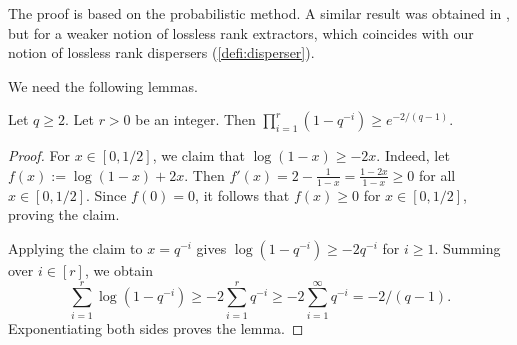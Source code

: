\documentclass[11pt]{article}
\begin{document}
The proof is based on the probabilistic method. A similar result was obtained in \cite[Section~5.3]{For14}, but for a weaker notion of lossless rank extractors, which coincides with our notion of lossless rank dispersers (\cref{defi:disperser}).

We need the following lemmas.

\begin{lemma}\label{lem:ineq}
Let $q\geq 2$. Let $r>0$ be an integer. Then $\prod_{i=1}^r (1-q^{-i})\geq e^{-2/(q-1)}$.
\end{lemma}

\begin{proof}
For \(x\in[0,1/2]\), we claim that $\log(1-x)\ge -2x$.
Indeed, let $f(x):=\log(1-x)+2x$. Then
$f'(x)=2-\frac{1}{1-x}=\frac{1-2x}{1-x}\ge 0$
for all \(x\in[0,1/2]\). Since \(f(0)=0\), it follows that \(f(x)\ge 0\) for \(x\in[0,1/2]\), proving the claim.

Applying the claim to $x=q^{-i}$ gives $\log(1-q^{-i})\ge -2q^{-i}$ for $i\geq 1$.
Summing over \(i\in [r]\), we obtain
\[
\sum_{i=1}^r \log(1-q^{-i})
\ge -2\sum_{i=1}^r q^{-i}
\ge -2\sum_{i=1}^\infty q^{-i}
= -2/(q-1).
\]
Exponentiating both sides proves the lemma.
\end{proof}
\end{document}
